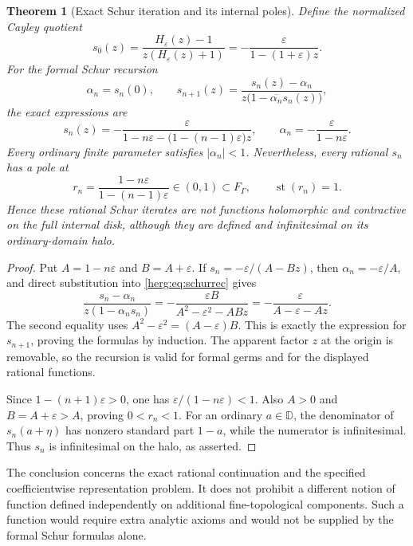\documentclass[11pt,letterpaper]{article}
\newtheorem{theorem}{Theorem}[section]
\theoremstyle{definition}
\newcommand{\D}{\mathbb D}\newcommand{\No}{\mathbf{No}}
\newcommand{\FG}{F_\Gamma}\newcommand{\KG}{K_\Gamma}
\newcommand{\st}{\operatorname{st}}
\newcommand{\eps}{\varepsilon}
\numberwithin{equation}{section}
\begin{document}
\begin{theorem}[Exact Schur iteration and its internal poles]\label{herg:thm:schur}
Define the normalized Cayley quotient
\[
 s_0(z)=\frac{H_\eps(z)-1}{z(H_\eps(z)+1)}
       =-\frac{\eps}{1-(1+\eps)z}.
\]
For the formal Schur recursion
\begin{equation}\label{herg:eq:schurrec}
 \alpha_n=s_n(0),\qquad
 s_{n+1}(z)=\frac{s_n(z)-\alpha_n}
 {z\bigl(1-\overline{\alpha_n}s_n(z)\bigr)},
\end{equation}
the exact expressions are
\begin{equation}\label{herg:eq:schurformula}
 s_n(z)=-\frac{\eps}
 {1-n\eps-\bigl(1-(n-1)\eps\bigr)z},
 \qquad
 \alpha_n=-\frac{\eps}{1-n\eps}.
\end{equation}
Every ordinary finite parameter satisfies $|\alpha_n|<1$. Nevertheless, every rational $s_n$ has a pole at
\begin{equation}\label{herg:eq:schurpole}
 r_n=\frac{1-n\eps}{1-(n-1)\eps}\in(0,1)\subset\FG,
 \qquad \st(r_n)=1.
\end{equation}
Hence these rational Schur iterates are not functions holomorphic and contractive on the full internal disk, although they are defined and infinitesimal on its ordinary-domain halo.
\end{theorem}
\begin{proof}
Put $A=1-n\eps$ and $B=A+\eps$. If $s_n=-\eps/(A-Bz)$, then $\alpha_n=-\eps/A$, and direct substitution into \eqref{herg:eq:schurrec} gives
\[
 \frac{s_n-\alpha_n}{z(1-\alpha_ns_n)}
 =-\frac{\eps B}{A^2-\eps^2-ABz}
 =-\frac{\eps}{A-\eps-Az}.
\]
The second equality uses $A^2-\eps^2=(A-\eps)B$. This is exactly the expression for $s_{n+1}$, proving the formulas by induction. The apparent factor $z$ at the origin is removable, so the recursion is valid for formal germs and for the displayed rational functions.

Since $1-(n+1)\eps>0$, one has $\eps/(1-n\eps)<1$. Also $A>0$ and $B=A+\eps>A$, proving $0<r_n<1$. For an ordinary $a\in\D$, the denominator of $s_n(a+\eta)$ has nonzero standard part $1-a$, while the numerator is infinitesimal. Thus $s_n$ is infinitesimal on the halo, as asserted.
\end{proof}

The conclusion concerns the exact rational continuation and the specified coefficientwise representation problem. It does not prohibit a different notion of function defined independently on additional fine-topological components. Such a function would require extra analytic axioms and would not be supplied by the formal Schur formulas alone.
\end{document}
